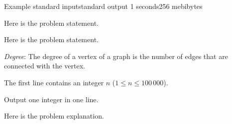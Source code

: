\begin{problem}{Example}
{standard input}{standard output}
{1 seconds}{256 mebibytes}{}

Here is the problem statement.

Here is the problem statement.

\textit{Degree}: The degree of a vertex of a graph is the number of edges that are connected with the vertex.

\InputFile

The first line contains an integer $n$ ($1 \le n \le 100\,000$).

\OutputFile

Output one integer in one line.

\Examples

\begin{example}
%
\end{example}

\Explanation

Here is the problem explanation.

\end{problem}
